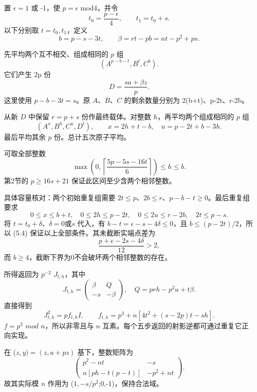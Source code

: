 {置} {\ensuremath{\epsilon =1}} {或} {-1，使} {\ensuremath{p=\epsilon }} {mod4，并令} \[
t_0=\frac{p-\epsilon}{4},\qquad
t_1=t_0+s.
\] {以下分别取} {\ensuremath{t=t_{0},t_{1}}，定义} \[
b=p-s-3t,\qquad
\beta=rt-pb=nt-p^2+ps.
\tag{C29.5.1}
\]

{先平均两个互不相交、组成相同的} {\ensuremath{p}} {组} \[
(A^{p-b-t},B^t,C^b).
\] {它们产生} {2p} {份} \[
D=\frac{s a+\beta z}{p}.
\tag{C29.5.2}
\] {这里使用} {\ensuremath{p-b-3t=s}。原} {\ensuremath{A}、\ensuremath{B}、\ensuremath{C}} {的剩余数量分别为} {2(b+t)、p-2t、r-2b。}

{从新} {\ensuremath{D}} {中保留} {\ensuremath{r=p+s}} {份作最终载体。对整数} {\ensuremath{h}，再平均两个组成相同的} {\ensuremath{p}} {组} \[
(A^x,B^h,C^u,D^t),\qquad
x=2h+t-b,\quad u=p-2t+b-3h.
\tag{C29.5.3}
\] {最后平均其余} {\ensuremath{p}} {份。总计五次原子平均。}

{可取全部整数} \[
\boxed{
\max\left(0,\left\lceil\frac{5p-5s-16t}{6}\right\rceil\right)
\le h\le b.}
\tag{C29.5.4}
\] {第2节的} {\ensuremath{p\ge 16s+21}} {保证此区间至少含两个相邻整数。}

{具体容量核对：两个初始重复组需要} {\ensuremath{2t\le p}、\ensuremath{2b\le r}、\ensuremath{p-b-t\ge 0}。最后重复组要求} \[
0\le x\le b+t,\quad
0\le2h\le p-2t,\quad
0\le2u\le r-2b,\quad
2t\le p-s.
\] {将} {\ensuremath{t=t_{0}+\delta }、\ensuremath{\delta =0}或\ensuremath{s}} {代入，有} {\ensuremath{b-t=\epsilon -s-4\delta \le 0}，且} {\ensuremath{b\le (p-2t)/2}，所以} {(5.4)} {保证以上全部条件。其未截断实端点差为} \[
\frac{p+\epsilon-2s-4\delta}{12}>2,
\] {而} {\ensuremath{b\ge 4}，截断下界为0不会破坏两个相邻整数的存在。}

{所得返回为} {\ensuremath{p^{-2}}} {\ensuremath{J_{t,h}}，其中} \[
J_{t,h}=
\begin{pmatrix}\beta&Q\\-s&-\beta\end{pmatrix},
\quad
Q=prh-p^2u+t\beta.
\] {直接得到} \[
\boxed{
J_{t,h}^2=p f_{t,h}I,\qquad
f_{t,h}=p^3+n[4t^2+(s-2p)t-sh].}
\tag{C29.5.5}
\] {\ensuremath{f=p^{3}}} {\ensuremath{mod}} {\ensuremath{n}，所以非零且与} {\ensuremath{n}} {互素。每个五步返回的射影逆都可通过重复它正向实现。}

{在} {(\ensuremath{z,y)=(z,a+pz)}} {基下，整数矩阵为} \[
\begin{pmatrix}
p^2-nt&-s\\
n[ph-t(p-t)]&-p^2+nt
\end{pmatrix}.
\tag{C29.5.6}
\] {故其实际模} {\ensuremath{n}} {作用为} {(\ensuremath{1,-s/p^{2}};0,-1)，保持合法域。}

